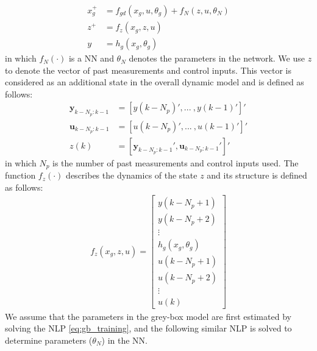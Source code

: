 \documentclass[10pt]{article}
\begin{document}
\begin{align*}
  x_g^+ &= f_{gd}(x_g, u, \theta_g) + f_N(z, u, \theta_N) \\
  z^+ &= f_z(x_g, z, u) \\
  y &= h_g(x_g, \theta_g)
\end{align*}
in which $f_N(\cdot)$ is a NN and $\theta_N$ denotes the parameters in the
network. We use $z$ to denote the vector of past measurements and control
inputs. This vector is considered as an additional state in the overall dynamic
model and is defined as follows:
\begin{align} \label{eq:pastyu}
  \mathbf{y}_{k-N_p:k-1} &= [y(k-N_p)', ... \ , y(k-1)']' \nonumber \\
  \mathbf{u}_{k-N_p:k-1} &= [u(k-N_p)', ... \ , u(k-1)']' \nonumber \\
  z(k) &= [\mathbf{y}_{k-N_p:k-1}', \mathbf{u}_{k-N_p:k-1}']'
\end{align}
in which $N_p$ is the number of past measurements and control inputs used. The
function $f_z(\cdot)$ describes the dynamics of the state $z$ and its structure
is defined as follows: 
\begin{align*}
  f_z(x_g, z, u) = \begin{bmatrix}
    y(k-N_p+1) \\
    y(k-N_p+2) \\
    \vdots \\
    h_g(x_g, \theta_g) \\
    u(k-N_p+1) \\ 
    u(k-N_p+2) \\
    \vdots \\
    u(k)
  \end{bmatrix}
\end{align*}
We assume that the parameters in the grey-box model are first estimated by
solving the NLP \eqref{eq:gb_training}, and the following similar NLP is solved
to determine parameters ($\theta_N$) in the NN.
\end{document}
